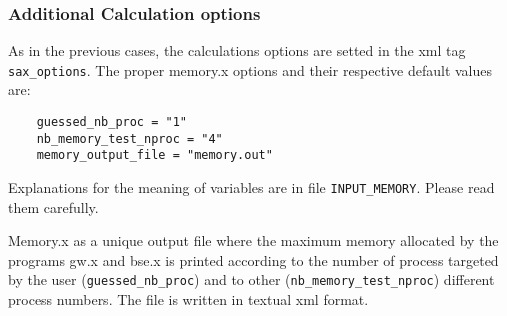 \documentclass[11pt]{article}
\begin{document}
\subsubsection{Additional Calculation options}
As in the previous cases, the calculations options are setted in the xml tag \texttt{sax\_options}. The proper memory.x options and their respective default values are:

\begin{verbatim}
    guessed_nb_proc = "1"
    nb_memory_test_nproc = "4"
    memory_output_file = "memory.out"
\end{verbatim}

Explanations for the meaning of variables are in file \texttt{INPUT\_MEMORY}. Please read them carefully.


Memory.x as a unique output file where the maximum memory allocated by the programs gw.x and bse.x is printed according to the number of process targeted by the user (\texttt{guessed\_nb\_proc}) and to other (\texttt{nb\_memory\_test\_nproc}) different process numbers. The file is written in textual xml format.  

\newpage


\end{document}
